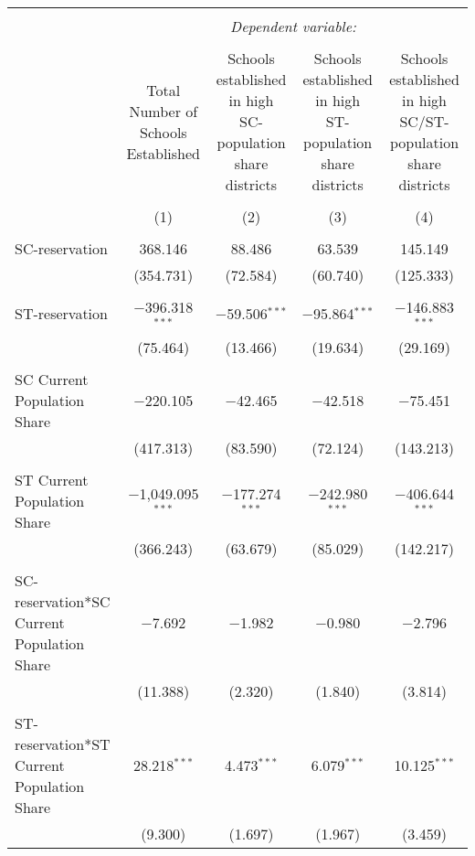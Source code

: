 
\begin{table}[!htbp] \centering 
  \caption{} 
  \label{} 
\begin{tabular}{@{\extracolsep{5pt}}lcccc} 
\\[-1.8ex]\hline 
\hline \\[-1.8ex] 
 & \multicolumn{4}{c}{\textit{Dependent variable:}} \\ 
\cline{2-5} 
\\[-1.8ex] & Total Number of Schools Established & Schools established in high SC-population share districts & Schools established in high ST-population share districts & Schools established in high SC/ST-population share districts \\ 
\\[-1.8ex] & (1) & (2) & (3) & (4)\\ 
\hline \\[-1.8ex] 
 SC-reservation & 368.146 & 88.486 & 63.539 & 145.149 \\ 
  & (354.731) & (72.584) & (60.740) & (125.333) \\ 
  & & & & \\ 
 ST-reservation & $-$396.318$^{***}$ & $-$59.506$^{***}$ & $-$95.864$^{***}$ & $-$146.883$^{***}$ \\ 
  & (75.464) & (13.466) & (19.634) & (29.169) \\ 
  & & & & \\ 
 SC Current Population Share & $-$220.105 & $-$42.465 & $-$42.518 & $-$75.451 \\ 
  & (417.313) & (83.590) & (72.124) & (143.213) \\ 
  & & & & \\ 
 ST Current Population Share & $-$1,049.095$^{***}$ & $-$177.274$^{***}$ & $-$242.980$^{***}$ & $-$406.644$^{***}$ \\ 
  & (366.243) & (63.679) & (85.029) & (142.217) \\ 
  & & & & \\ 
 SC-reservation*SC Current Population Share & $-$7.692 & $-$1.982 & $-$0.980 & $-$2.796 \\ 
  & (11.388) & (2.320) & (1.840) & (3.814) \\ 
  & & & & \\ 
 ST-reservation*ST Current Population Share & 28.218$^{***}$ & 4.473$^{***}$ & 6.079$^{***}$ & 10.125$^{***}$ \\ 
  & (9.300) & (1.697) & (1.967) & (3.459) \\ 

\end{tabular}
\end{table}
